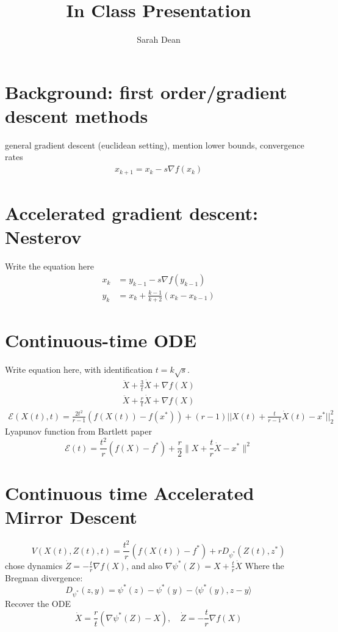\documentclass{article}
\title{In Class Presentation}
\author{Sarah Dean}
\begin{document}
\maketitle

\section{Background: first order/gradient descent methods}
general gradient descent (euclidean setting), mention lower bounds, convergence rates 
\begin{align*}
    x_{k+1} = x_k - s \nabla f(x_k) 
\end{align*}
\section{Accelerated gradient descent: Nesterov}
Write the equation here
\begin{align*}
    x_k &= y_{k-1} - s \nabla f(y_{k-1})\\
    y_k &= x_k + \frac{k-1}{k+2} (x_k - x_{k-1}) 
\end{align*}

\section{Continuous-time ODE}
Write equation here, with identification $t=k\sqrt{s}$.
\begin{align*}
    \ddot{X} + \frac{3}{t} \dot{X} + \nabla f(X) 
\end{align*}
\begin{align*}
    \ddot{X} + \frac{r}{t} \dot{X} + \nabla f(X) \label{highfrictionode}
\end{align*}
\begin{align*}
    \mathcal{E}(X(t), t) = \frac{2t^2}{r-1} \left( f(X(t)) -f(x^*) \right) + (r-1) ||X(t) + \frac{t}{r-1}\dot{X}(t) -x^*||_2^2
\end{align*}
Lyapunov function from Bartlett paper
\[\mathcal{E}(t) = \frac{t^2}{r} (f(X) - f^*) + \frac{r}{2} \|X+\frac{t}{r}\dot X - x^* \|^2\]

\section{Continuous time Accelerated Mirror Descent}
\[ V(X(t),Z(t),t) = \frac{t^2}{r} (f(X(t)) - f^*) + r D_{\psi^*} (Z(t), z^*) \]
chose dynamics $\dot Z = -\frac{t}{r} \nabla f(X)$, and also $\nabla \psi^*(Z) = X + \frac{t}{r} \dot X$ Where
the Bregman divergence: 
\[ D_{\psi^*}(z,y) = \psi^*(z) - \psi^*(y) - \langle \psi^*(y), z-y\rangle \]
Recover the ODE
\[ \dot X = \frac{r}{t} (\nabla \psi^*(Z) - X),\quad \dot Z = -\frac{t}{r} \nabla f(X) \]
\end{document}
